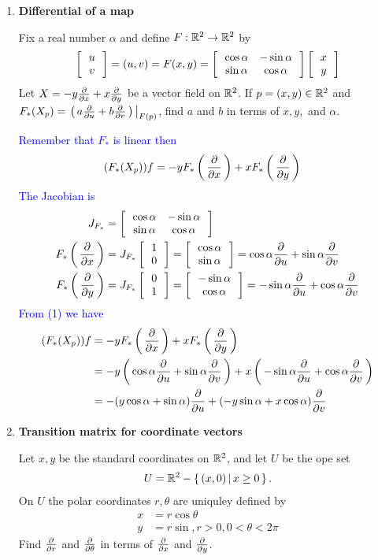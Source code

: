 \documentclass[12pt,a4paper]{report}
\newcommand{\BLUE}[1]{\textcolor{blue}{#1}}
\begin{document}
\begin{enumerate}[label=8.\arabic*.]
\item \textbf{Differential of a map}

Fix a real number $\alpha$ and define $F: \mathbb{R}^2 \to \mathbb{R}^2$ by 
\begin{align*}
	\left [\, \begin{array}{c} 
		u \\ v	
	 \end{array}  \,\right ] = (u,v) = F(x,y) = \left [\,  \begin{array}{c c} \cos \alpha&-\sin \alpha  \\  \sin \alpha  &  \cos \alpha \end{array}  \,\right ] \left [\, \begin{array}{c} x\\y \end{array}  \,\right ]
\end{align*}Let $X = -y\frac{\partial }{\partial x}+x\frac{\partial }{\partial y}$ be a vector field on $\mathbb{R}^2$. If $p=(x,y)\in\mathbb{R}^2$ and $F_*(X_p) = \left . \left (\,  a\frac{\partial }{\partial u}+b\frac{\partial }{\partial v} \,\right ) \, \right |_{F(p)}$, find $a$ and $b$ in terms of $x,y, $ and $\alpha$.

\BLUE{Remember that $F_*$ is linear then\begin{align}
	(F_*(X_p))f &= -yF_*\left (\, \frac{\partial }{\partial x} \,\right )+xF_*\left (\, \frac{\partial }{\partial y} \,\right )
\end{align}The Jacobian is 
\begin{align*}
	J_{F_*} &= \left [\,  \begin{array}{c c} \cos \alpha&-\sin \alpha  \\  \sin \alpha  &  \cos \alpha \end{array}  \,\right ] \\
	F_*\left (\, \frac{\partial }{\partial x} \,\right ) &= J_{F_*} \left [\, \begin{array}{c}  1 \\ 0  \end{array}  \,\right ] = \left [\, \begin{array}{c} \cos \alpha \\ \sin\alpha \end{array}  \,\right ]= \cos \alpha \frac{\partial }{\partial u} + \sin\alpha\frac{\partial }{\partial v}\\
	F_*\left (\, \frac{\partial }{\partial y} \,\right ) &= J_{F_*} \left [\, \begin{array}{c}  0 \\ 1  \end{array}  \,\right ] = \left [\, \begin{array}{c} -\sin \alpha \\ \cos\alpha \end{array}  \,\right ]= -\sin \alpha \frac{\partial }{\partial u} + \cos\alpha\frac{\partial }{\partial v}
\end{align*}From (1) we have
\begin{align*}
	(F_*(X_p))f &= -yF_*\left (\, \frac{\partial }{\partial x} \,\right )+xF_*\left (\, \frac{\partial }{\partial y} \,\right ) \\
	&= -y \left (\, \cos \alpha \frac{\partial }{\partial u} + \sin\alpha\frac{\partial }{\partial v} \,\right ) +x \left (\, -\sin \alpha \frac{\partial }{\partial u} + \cos\alpha\frac{\partial }{\partial v} \,\right ) \\
	&= -(y\cos \alpha + \sin \alpha)\frac{\partial }{\partial u} + (-y\sin\alpha+x\cos\alpha)\frac{\partial }{\partial v}
\end{align*}
}

\item \textbf{Transition matrix for coordinate vectors}

Let $x,y$ be the standard coordinates on $\mathbb{R}^2$, and let $U$ be the ope set
\begin{align*}
	U = \mathbb{R}^2-\left \{\, (x,0)\,|\, x \ge 0 \,\right \}.
\end{align*}On $U$ the polar coordinates $r,\theta$ are uniquley defined by 
\begin{align*}
	x &= r\cos \theta\\
	y &= r \sin, r > 0, 0 < \theta < 2 \pi
\end{align*}Find $\frac{\partial }{\partial r}$ and $\frac{\partial }{\partial \theta}$ in terms of $\frac{\partial }{\partial x}$ and $\frac{\partial }{\partial y}$.


\end{enumerate}
\end{document}
